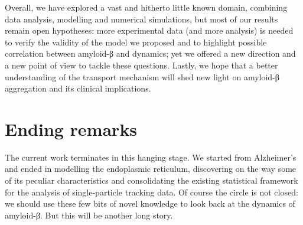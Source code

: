 Overall, we have explored a vast and hitherto little known domain, combining data analysis, modelling and numerical simulations, but most of our results remain open hypotheses: more experimental data (and more analysis) is needed to verify the validity of the  model we proposed and to highlight possible correlation between amyloid-β and  dynamics; yet we offered a new direction and a new point of view to tackle these questions. Lastly, we hope that a better understanding of the  transport mechanism will shed new light on amyloid-β aggregation and its clinical implications.

\section{Ending remarks}

The current work terminates in this hanging stage. We started from Alzheimer's and ended in modelling the endoplasmic reticulum, discovering on the way some of its peculiar characteristics and consolidating the existing statistical framework for the analysis of single-particle tracking data. Of course the circle is not closed: we should use these few bits of novel knowledge to look back at the dynamics of amyloid-β. But this will be another long story.

